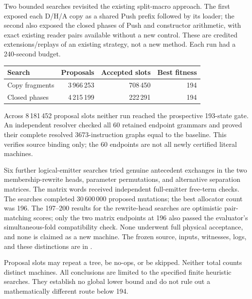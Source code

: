 Two bounded searches revisited the existing split-macro approach.
The first exposed each D/H/A copy as a shared Push prefix followed by its
loader; the second also exposed the closed phases of Push and constructor
arithmetic, with exact existing reader pairs available without a new
control. These are credited extensions/replays of an existing strategy,
not a new method. Each run had a 240-second budget.
\begin{center}\small
\begin{tabular}{@{}lrrr@{}}
\toprule
Search & Proposals & Accepted slots & Best fitness \\
\midrule
Copy fragments & 3\,966\,253 & 708\,450 & 194 \\
Closed phases & 4\,215\,199 & 222\,291 & 194 \\
\bottomrule
\end{tabular}
\end{center}
Across 8\,181\,452 proposal slots neither run reached the prospective
193-state gate. An independent resolver checked all 60 retained endpoint
grammars and proved their complete resolved 3673-instruction graphs equal
to the baseline. This verifies source binding only; the 60 endpoints are
not all newly certified literal machines.

Six further logical-emitter searches tried genuine antecedent exchanges
in the two membership-rewrite heads, parameter permutations, and alternative
separation matrices. The matrix words received independent full-emitter
free-term checks. The searches completed 30\,600\,000 proposed mutations;
the best allocator count was 196. The 197--200 results for the rewrite-head
searches are optimistic pair-matching scores; only the two matrix endpoints
at 196 also passed the evaluator's simultaneous-fold compatibility check.
None underwent full physical acceptance, and none is claimed as a new
machine. The frozen source, inputs, witnesses, logs, and these distinctions
are in .

Proposal slots may repeat a tree, be no-ops, or be skipped. Neither total
counts distinct machines. All conclusions are limited to the specified
finite heuristic searches. They establish no global lower bound and do not
rule out a mathematically different route below 194.
